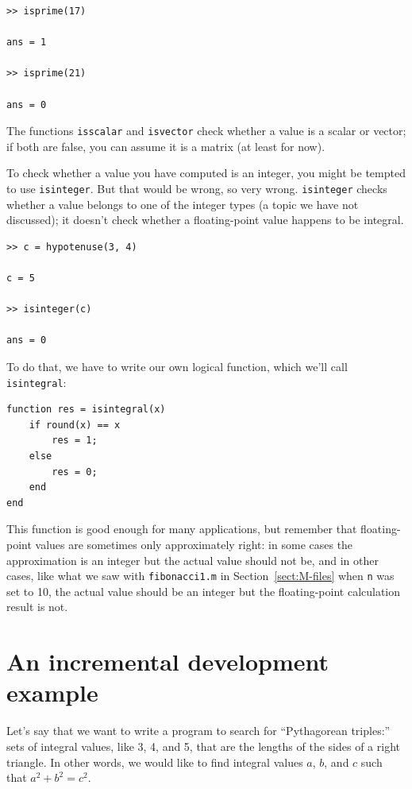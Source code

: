 \documentclass[
]{book}
\begin{document}
\begin{verbatim}
>> isprime(17)

ans = 1

>> isprime(21)

ans = 0
\end{verbatim}

The functions {\tt isscalar} and {\tt isvector} check whether
a value is a scalar or vector; if both are false, you can assume
it is a matrix (at least for now).

To check whether a value you have computed is an integer, you might
be tempted to use {\tt isinteger}.  But that would be wrong, so very
wrong.  {\tt isinteger} checks whether a value belongs to one of
the integer types (a topic we have not discussed); it doesn't check
whether a floating-point value happens to be integral.

\begin{verbatim}
>> c = hypotenuse(3, 4)

c = 5

>> isinteger(c)

ans = 0
\end{verbatim}

To do that, we have to write our own logical function, which
we'll call {\tt isintegral}:

\begin{verbatim}
function res = isintegral(x)
    if round(x) == x
        res = 1;
    else
        res = 0;
    end
end
\end{verbatim}

This function is good enough for many applications, but remember
that floating-point values are
sometimes
only approximately right: in some
cases the approximation is an integer but the actual
value should not be,
and in other cases, like what we saw with {\tt fibonacci1.m} in 
Section~\ref{sect:M-files} when {\tt n} was set to 10,
the actual value should be an integer but the 
floating-point calculation result is not.


\section{An incremental development example}
\label{sect:increxample}

Let's say that we want to write a program to search for ``Pythagorean
triples:'' sets of integral values, like 3, 4, and 5,
that are the lengths of the sides of a right triangle.  In other
words, we would like to find integral values $a$, $b$, and $c$ such
that $a^2 + b^2 = c^2$.
\end{document}

